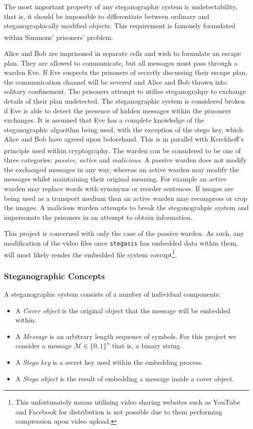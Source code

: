 \documentclass[paper=a4, fontsize=11pt,twoside]{scrartcl}
\numberwithin{table}{section}
\numberwithin{figure}{section}
\numberwithin{algorithm}{section}
\begin{document}
\noindent
The most important property of any steganographic system is undetectability, that is, it should be impossible to differentiate between ordinary and steganographically modified objects. This requirement is famously formulated within Simmons' prisoners' problem\textsuperscript{\cite{prisoner}}. 

Alice and Bob are imprisoned in separate cells and wish to formulate an escape plan. They are allowed to communicate, but all messages must pass through a warden Eve. If Eve suspects the prisoners of secretly discussing their escape plan, the communication channel will be severed and Alice and Bob thrown into solitary confinement. The prisoners attempt to utilise steganograhpy to exchange details of their plan undetected. The steganographic system is considered broken if Eve is able to detect the presence of hidden messages within the prisoners exchanges. It is assumed that Eve has a complete knowledge of the steganographic algorithm being used, with the exception of the stego key, which Alice and Bob have agreed upon beforehand. This is in parallel with Kerckhoff's principle used within cryptography\textsuperscript{\cite{kirc}}. The warden can be considered to be one of three categories: \textit{passive}, \textit{active} and \textit{malicious}. A passive warden does not modify the exchanged messages in any way, whereas an active warden may modify the messages whilst maintaining their original meaning. For example an active warden may replace words with synonyms or reorder sentences. If images are being used as a transport medium then an active warden may recompress or crop the images. A malicious warden attempts to break the steganograhpic system and impersonate the prisoners in an attempt to obtain information.

This project is concerned with only the case of the passive warden. As such, any modification of the video files once \texttt{stegasis} has embedded data within them, will most likely render the embedded file system corrupt\footnote{This unfortunately means utilising video sharing websites such as YouTube and Facebook for distribution is not possible due to them performing compression upon video upload.}.


\subsubsection{Steganographic Concepts}
A steganographic system consists of a number of individual components:
\begin{itemize}
	\item A \textit{Cover object} is the original object that the message will be embedded within.
	\item A \textit{Message} is an arbitrary length sequence of symbols. For this project we consider a message $\mathcal{M} \in \{0,1\}^{n} $ that is, a binary string.
	\item A \textit{Stego key} is a secret key used within the embedding process.
	\item A \textit{Stego object} is the result of embedding a message inside a cover object.
\end{itemize}
\end{document}
